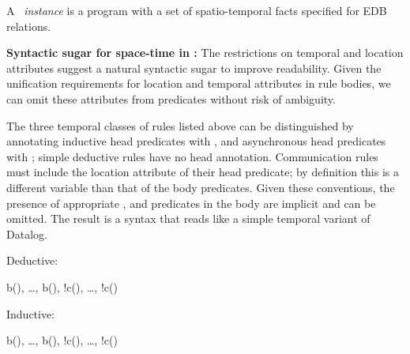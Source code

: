 
A \lang\ {\em instance} is a program with a set of spatio-temporal facts specified for EDB relations. 

\noindent
\textbf{Syntactic sugar for space-time in \lang:}
The restrictions on temporal and location attributes suggest a natural syntactic sugar to improve readability.  Given the unification requirements for location and temporal attributes in rule bodies, we can omit these attributes from predicates without risk of ambiguity.  

The three temporal classes of rules listed above can be distinguished by annotating inductive head predicates with , and asynchronous head predicates with ; simple deductive rules have no head annotation. 
Communication rules must include the location attribute of their head predicate; by definition this is a different variable than that of the body predicates.
 Given these conventions, the presence of appropriate ,  and  predicates in the body are implicit and can be omitted.  The result is a syntax that reads like a simple temporal variant of Datalog.

Deductive:

\begin{Drules}
        {b(), \ldots, b(), !c(), \ldots, !c()}
\end{Drules}

Inductive:

\begin{Drules}
        {b(), \ldots, b(), !c(), \ldots, !c()}
\end{Drules}


